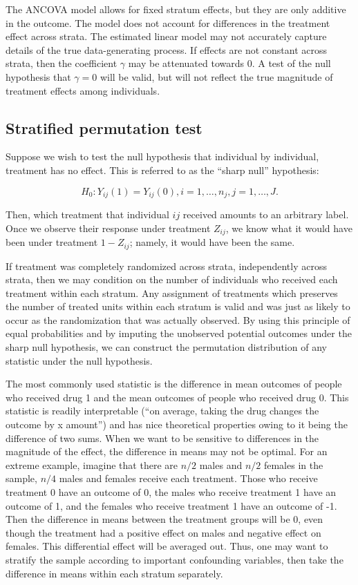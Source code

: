 \documentclass[11pt]{article}
\begin{document}
The ANCOVA model allows for fixed stratum effects, but they are only additive in the outcome.  
The model does not account for differences in the treatment effect across strata.  
The estimated linear model may not accurately capture details of the true data-generating process.  
If effects are not constant across strata, then the coefficient $\gamma$ may be attenuated towards 0.  
A test of the null hypothesis that $\gamma = 0$ will be valid, but will not reflect the true magnitude of treatment effects among individuals.

\subsection{Stratified permutation test}
Suppose we wish to test the null hypothesis that individual by individual, treatment has no effect.
This is referred to as the ``sharp null'' hypothesis:

$$H_0: Y_{ij}(1) = Y_{ij}(0), i = 1, \dots, n_j, j = 1,\dots, J.$$

Then, which treatment that individual $ij$ received amounts to an arbitrary label.
Once we observe their response under treatment $Z_{ij}$, we know what it would have been under treatment $1-Z_{ij}$; namely, it would have been the same.

If treatment was completely randomized across strata, independently across strata,
then we may condition on the number of individuals who received each treatment within each stratum.
Any assignment of treatments which preserves the number of treated units within each stratum is valid and was just as likely to occur as the randomization that was actually observed.
By using this principle of equal probabilities and by imputing the unobserved potential outcomes under the sharp null hypothesis, we can construct the permutation distribution of any statistic under the null hypothesis.

The most commonly used statistic is the difference in mean outcomes of people who received drug 1 and the mean outcomes of people who received drug 0.  This statistic is readily interpretable (``on average, taking the drug changes the outcome by x amount'') and has nice theoretical properties owing to it being the difference of two sums.
When we want to be sensitive to differences in the magnitude of the effect, the difference in means may not be optimal.  For an extreme example, imagine that there are $n/2$ males and $n/2$ females in the sample, $n/4$ males and females receive each treatment.  Those who receive treatment 0 have an outcome of 0, the males who receive treatment 1 have an outcome of 1, and the females who receive treatment 1 have an outcome of -1.  Then the difference in means between the treatment groups will be $0$, even though the treatment had a positive effect on males and negative effect on females.  This differential effect will be averaged out.
Thus, one may want to stratify the sample according to important confounding variables, then take the difference in means within each stratum separately. 
\end{document}
